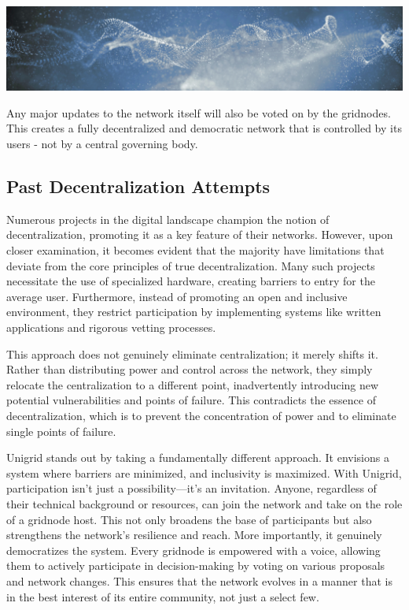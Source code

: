 \documentclass[a4paper,oneside]{article}
\begin{document}
\vspace{0.05cm}
\begin{mdframed}[style=textimage]
	\includegraphics[width=381pt]{abstract-particles}
\end{mdframed}

\noindent Any major updates to the network itself will also be voted on by the gridnodes. This creates a fully decentralized and democratic network that is controlled by its users - not by a central governing body.

\subsection{Past Decentralization Attempts}
Numerous projects in the digital landscape champion the notion of decentralization, promoting it as a key feature of their networks. However, upon closer examination, it becomes evident that the majority have limitations that deviate from the core principles of true decentralization. Many such projects necessitate the use of specialized hardware, creating barriers to entry for the average user. Furthermore, instead of promoting an open and inclusive environment, they restrict participation by implementing systems like written applications and rigorous vetting processes.

This approach does not genuinely eliminate centralization; it merely shifts it. Rather than distributing power and control across the network, they simply relocate the centralization to a different point, inadvertently introducing new potential vulnerabilities and points of failure. This contradicts the essence of decentralization, which is to prevent the concentration of power and to eliminate single points of failure.

Unigrid stands out by taking a fundamentally different approach. It envisions a system where barriers are minimized, and inclusivity is maximized. With Unigrid, participation isn't just a possibility—it's an invitation. Anyone, regardless of their technical background or resources, can join the network and take on the role of a gridnode host. This not only broadens the base of participants but also strengthens the network's resilience and reach. More importantly, it genuinely democratizes the system. Every gridnode is empowered with a voice, allowing them to actively participate in decision-making by voting on various proposals and network changes. This ensures that the network evolves in a manner that is in the best interest of its entire community, not just a select few.
\end{document}
